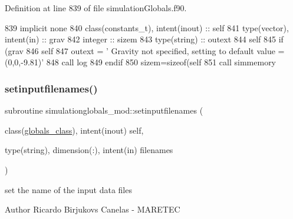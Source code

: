 Definition at line 839 of file simulation\+Globals.\+f90.


\begin{DoxyCode}
839     \textcolor{keywordtype}{implicit none}
840     \textcolor{keywordtype}{class}(constants\_t), \textcolor{keywordtype}{intent(inout)} :: self
841     \textcolor{keywordtype}{type}(vector), \textcolor{keywordtype}{intent(in)} :: grav
842     \textcolor{keywordtype}{integer} :: sizem
843     \textcolor{keywordtype}{type}(string) :: outext
844     self%
845     \textcolor{keywordflow}{if} (grav%
846         self%
847         outext = \textcolor{stringliteral}{'       Gravity not specified, setting to default value = (0,0,-9.81)'}
848         \textcolor{keyword}{call }log%
849 \textcolor{keywordflow}{    endif}
850     sizem=sizeof(self%
851     \textcolor{keyword}{call }simmemory%
\end{DoxyCode}
\mbox{\label{namespacesimulationglobals__mod_a422e3d203aad010489f541f645f63517}} 
\subsubsection{\texorpdfstring{setinputfilenames()}{setinputfilenames()}}
{\footnotesize\ttfamily subroutine simulationglobals\+\_\+mod\+::setinputfilenames (\begin{DoxyParamCaption}\item[{class(\mbox{\hyperlink{structsimulationglobals__mod_1_1globals__class}{globals\+\_\+class}}), intent(inout)}]{self,  }\item[{type(string), dimension(\+:), intent(in)}]{filenames }\end{DoxyParamCaption})\hspace{0.3cm}{\ttfamily [private]}}



set the name of the input data files 

\begin{DoxyAuthor}{Author}
Ricardo Birjukovs Canelas -\/ M\+A\+R\+E\+T\+EC 
\end{DoxyAuthor}


